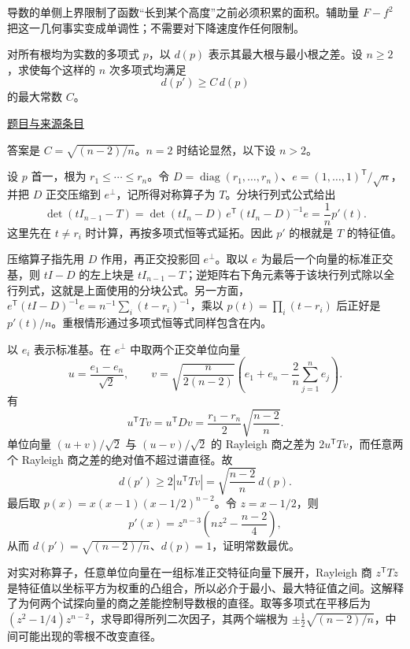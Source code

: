 \documentclass[UTF8,12pt,a4paper,fontset=fandol]{ctexart}
\begin{document}
\begin{remark}[方法与条件]导数的单侧上界限制了函数“长到某个高度”之前必须积累的面积。辅助量 $F-f^2$ 把这一几何事实变成单调性；不需要对下降速度作任何限制。\end{remark}

\begin{example}[来源序号4]\label{ex:fin05-hi:4}\label{pr:fin05-hi:4}

对所有根均为实数的多项式 $p$，以 $d(p)$ 表示其最大根与最小根之差。设 $n\ge2$，求使每个这样的 $n$ 次多项式均满足
\[
d(p')\ge C\,d(p)
\]
的最大常数 $C$。

\par\href{https://github.com/lzxcr/cmc-mathematics/blob/64916fa1fdbc3e444a652eca204d5669058ee321/src/problems/finals/05/04.md}{题目与来源条目}

\end{example}

\begin{solve}\label{ans:fin05-hi:4}

答案是 $C=\sqrt{(n-2)/n}$。$n=2$ 时结论显然，以下设 $n>2$。

设 $p$ 首一，根为 $r_1\le\cdots\le r_n$。令
$D=\operatorname{diag}(r_1,\ldots,r_n)$、$e=(1,\ldots,1)^{\mathsf T}/\sqrt n$，并把 $D$ 正交压缩到 $e^\perp$，记所得对称算子为 $T$。分块行列式公式给出
\[
\det(tI_{n-1}-T)
=\det(tI_n-D)\,e^{\mathsf T}(tI_n-D)^{-1}e
=\frac1n p'(t).
\]
这里先在 $t\ne r_i$ 时计算，再按多项式恒等式延拓。因此 $p'$ 的根就是 $T$ 的特征值。

压缩算子指先用 $D$ 作用，再正交投影回 $e^\perp$。取以 $e$ 为最后一个向量的标准正交基，则 $tI-D$ 的左上块是 $tI_{n-1}-T$；逆矩阵右下角元素等于该块行列式除以全行列式，这就是上面使用的分块公式。另一方面，$e^{\mathsf T}(tI-D)^{-1}e=n^{-1}\sum_i(t-r_i)^{-1}$，乘以 $p(t)=\prod_i(t-r_i)$ 后正好是 $p'(t)/n$。重根情形通过多项式恒等式同样包含在内。

以 $e_i$ 表示标准基。在 $e^\perp$ 中取两个正交单位向量
\[
u=\frac{e_1-e_n}{\sqrt2},\qquad
v=\sqrt{\frac{n}{2(n-2)}}
\left(e_1+e_n-\frac2n\sum_{j=1}^n e_j\right).
\]
有
\[
u^{\mathsf T}Tv=u^{\mathsf T}Dv
=\frac{r_1-r_n}{2}\sqrt{\frac{n-2}{n}}.
\]
单位向量 $(u+v)/\sqrt2$ 与 $(u-v)/\sqrt2$ 的 Rayleigh 商之差为 $2u^{\mathsf T}Tv$，而任意两个 Rayleigh 商之差的绝对值不超过谱直径。故
\[
d(p')\ge2|u^{\mathsf T}Tv|=\sqrt{\frac{n-2}{n}}\,d(p).
\]
最后取 $p(x)=x(x-1)(x-1/2)^{n-2}$。令 $z=x-1/2$，则
\[
p'(x)=z^{n-3}\left(nz^2-\frac{n-2}{4}\right),
\]
从而 $d(p')=\sqrt{(n-2)/n}$、$d(p)=1$，证明常数最优。

对实对称算子，任意单位向量在一组标准正交特征向量下展开，Rayleigh 商 $z^{\mathsf T}Tz$ 是特征值以坐标平方为权重的凸组合，所以必介于最小、最大特征值之间。这解释了为何两个试探向量的商之差能控制导数根的直径。取等多项式在平移后为 $(z^2-1/4)z^{n-2}$，求导即得所列二次因子，其两个端根为 $\pm\tfrac12\sqrt{(n-2)/n}$，中间可能出现的零根不改变直径。

\end{solve}
\end{document}
